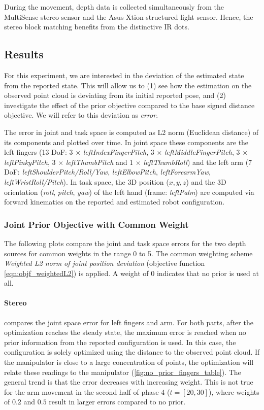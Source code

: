 During the movement, depth data is collected simultaneously from the MultiSense stereo sensor and the Asus Xtion structured light sensor. Hence, the stereo block matching benefits from the distinctive IR dots.


\subsection{Results}
\label{sec:prior_results}

For this experiment, we are interested in the deviation of the estimated state from the reported state. This will allow us to (1) see how the estimation on the observed point cloud is deviating from its initial reported pose, and (2) investigate the effect of the prior objective compared to the base signed distance objective. We will refer to this deviation as \emph{error}.

The error in joint and task space is computed as L2 norm (Euclidean distance) of its components and plotted over time. In joint space these components are the left fingers (13 DoF: 3 $\times$ \emph{leftIndexFingerPitch}, 3 $\times$ \emph{leftMiddleFingerPitch}, 3 $\times$ \emph{leftPinkyPitch}, 3 $\times$ \emph{leftThumbPitch} and 1 $\times$ \emph{leftThumbRoll}) and the left arm (7 DoF: \emph{leftShoulderPitch/Roll/Yaw}, \emph{leftElbowPitch}, \emph{leftForearmYaw}, \emph{leftWristRoll/Pitch}). In task space, the 3D position ($x,y,z$) and the 3D orientation (\textit{roll}, \textit{pitch}, \textit{yaw}) of the left hand (frame: \emph{leftPalm}) are computed via forward kinematics on the reported and estimated robot configuration.

\subsubsection{Joint Prior Objective with Common Weight}

The following plots compare the joint and task space errors for the two depth sources for common weights in the range 0 to 5. The common weighting scheme \emph{Weighted L2 norm of joint position deviation} (objective function \cref{eqn:objf_weightedL2}) is applied. A weight of 0 indicates that no prior is used at all.

\paragraph{Stereo}

 compares the joint space error for left fingers and arm. For both parts, after the optimization reaches the steady state, the maximum error is reached when no prior information from the reported configuration is used. In this case, the configuration is solely optimized using the distance to the observed point cloud. If the manipulator is close to a large concentration of points, the optimization will relate these readings to the manipulator (\cref{fig:no_prior_fingers_table}).
The general trend is that the error decreases with increasing weight. This is not true for the arm movement in the second half of phase 4 ($t=[20,30]$), where weights of $0.2$ and $0.5$ result in larger errors compared to no prior.

